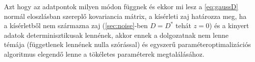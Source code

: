 Azt hogy az adatpontok milyen módon függnek és ekkor mi lesz a \ref{eq:gaussD} normál eloszlásban szereplő kovariancia mátrix, a kísérleti zaj határozza meg, ha a kísérletből nem származna zaj (\ref{sec:noise}-ben $D = D^*$ tehát $z=0$) és a kinyert adatok determinisztikusak lennének, akkor ennek a dolgozatnak nem lenne témája (függetlenek lennének nulla szórással) és egyszerű paraméteroptimalizációs algoritmus elegendő lenne a tökéletes paraméterek megtalálásához.



\FloatBarrier
